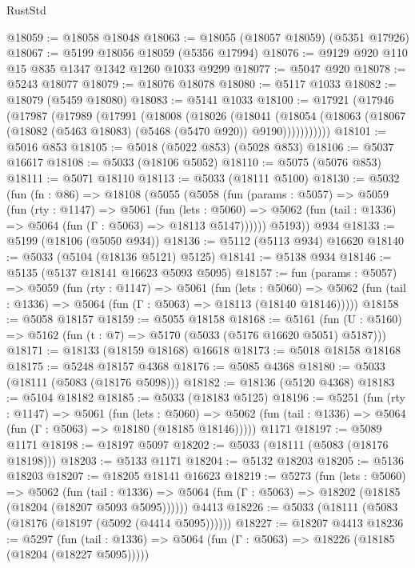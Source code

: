 \begin{lexlean}{RustStd}
\begin{coremodule}
@18059 := @18058 @18048
@18063 := @18055 (@18057 @18059) (@5351 @17926)
@18067 := @5199 @18056 @18059 (@5356 @17994)
@18076 := @9129 @920 @110 @15 @835 @1347 @1342 @1260 @1033 @9299
@18077 := @5047 @920
@18078 := @5243 @18077
@18079 := @18076 @18078
@18080 := @5117 @1033
@18082 := @18079 (@5459 @18080)
@18083 := @5141 @1033
@18100 := @17921
    (@17946
      (@17987
        (@17989
          (@17991
            (@18008
              (@18026
                (@18041
                  (@18054
                    (@18063 (@18067 (@18082 (@5463 @18083) (@5468 (@5470 @920)) @9190)))))))))))
@18101 := @5016 @853
@18105 := @5018 (@5022 @853) (@5028 @853)
@18106 := @5037 @16617
@18108 := @5033 (@18106 @5052)
@18110 := @5075 (@5076 @853)
@18111 := @5071 @18110
@18113 := @5033 (@18111 @5100)
@18130 := @5032
    (fun (fn : @86) =>
    @18108
      (@5055
        (@5058
          (fun (params : @5057) =>
          @5059
            (fun (rty : @1147) =>
            @5061
              (fun (lets : @5060) =>
              @5062 (fun (tail : @1336) => @5064 (fun (Γ : @5063) => @18113 @5147))))))
        @5193))
    @934
@18133 := @5199 (@18106 (@5050 @934))
@18136 := @5112 (@5113 @934) @16620
@18140 := @5033 (@5104 (@18136 @5121) @5125)
@18141 := @5138 @934
@18146 := @5135 (@5137 @18141 @16623 @5093 @5095)
@18157 := fun (params : @5057) =>
  @5059
    (fun (rty : @1147) =>
    @5061
      (fun (lets : @5060) =>
      @5062 (fun (tail : @1336) => @5064 (fun (Γ : @5063) => @18113 (@18140 @18146)))))
@18158 := @5058 @18157
@18159 := @5055 @18158
@18168 := @5161
    (fun (U : @5160) => @5162 (fun (t : @7) => @5170 (@5033 (@5176 @16620 @5051) @5187)))
@18171 := @18133 (@18159 @18168) @16618
@18173 := @5018 @18158 @18168
@18175 := @5248 @18157 @4368
@18176 := @5085 @4368
@18180 := @5033 (@18111 (@5083 (@18176 @5098)))
@18182 := @18136 (@5120 @4368)
@18183 := @5104 @18182
@18185 := @5033 (@18183 @5125)
@18196 := @5251
    (fun (rty : @1147) =>
    @5061
      (fun (lets : @5060) =>
      @5062 (fun (tail : @1336) => @5064 (fun (Γ : @5063) => @18180 (@18185 @18146)))))
    @1171
@18197 := @5089 @1171
@18198 := @18197 @5097
@18202 := @5033 (@18111 (@5083 (@18176 @18198)))
@18203 := @5133 @1171
@18204 := @5132 @18203
@18205 := @5136 @18203
@18207 := @18205 @18141 @16623
@18219 := @5273
    (fun (lets : @5060) =>
    @5062
      (fun (tail : @1336) =>
      @5064 (fun (Γ : @5063) => @18202 (@18185 (@18204 (@18207 @5093 @5095))))))
    @4413
@18226 := @5033 (@18111 (@5083 (@18176 (@18197 (@5092 (@4414 @5095))))))
@18227 := @18207 @4413
@18236 := @5297
    (fun (tail : @1336) => @5064 (fun (Γ : @5063) => @18226 (@18185 (@18204 (@18227 @5095)))))

\end{coremodule}
\end{lexlean}
